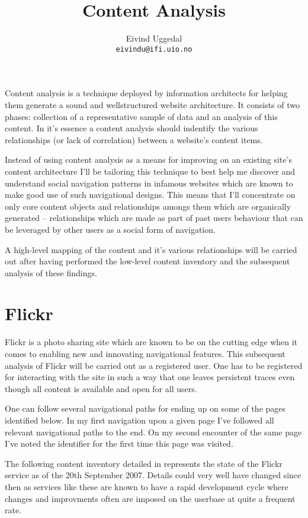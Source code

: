 \documentclass[11pt,a4paper]{article}
\title{Content Analysis}
\author{Eivind Uggedal\\
        \texttt{eivindu@ifi.uio.no}}
\date{}
\begin{document}
\maketitle{}


Content analysis is a technique deployed by information architects for helping
them generate a sound and wellstructured website architecture. It consists of
two phases: collection of a representative sample of data and an analysis of
this content. In it's essence a content analysis should indentify the various
relationships (or lack of correlation) between a website's content items.

Instead of using content analysis as a means for improving on an existing
site's content architecture I'll be tailoring this technique to best help me
discover and understand social navigation patterns in infamous websites which
are known to make good use of such navigational designs. This means that I'll
concentrate on only core content objects and relationships amongs them
which are organically generated -- relationships which are made as part of
past users behaviour that can be leveraged by other users as a social form
of navigation.

A high-level mapping of the content and it's various relationships
will be carried out after having performed the low-level content inventory
and the subsequent analysis of these findings.

\section{Flickr}

Flickr is a photo sharing site which are known to be on the cutting edge when
it comes to enabling new and innovating navigational features. This subsequent
analysis of Flickr will be carried out as a registered user. One has to be
registered for interacting with the site in such a way that one leaves
persistent traces even though all content is available and open for all users.

One can follow several navigational paths for ending up on some of the pages
identified below. In my first navigation upon a given page I've followed all
relevant navigational paths to the end. On my second encounter of the same
page I've noted the identifier for the first time this page was visited.

The following content inventory detailed in
represents the state of the Flickr service as of the 20th September 2007.
Details could very well have changed since then as
services like these are known to have a rapid development cycle
where changes and improvments often are imposed on the userbase at quite
a frequent rate.
\end{document}

